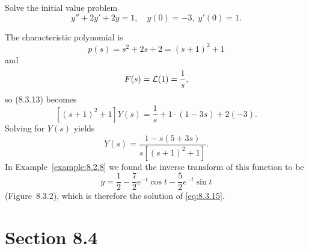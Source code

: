 \setcounter{example}{3}
\setcounter{equation}{14}
\begin{example}
  \label{example:8.3.4}\rm Solve the initial value problem
  \begin{equation}
    \label{eq:8.3.15}y''+2y'+2y=1,\quad y(0)=-3,\;y'(0)=1.
  \end{equation}
\end{example}
\begin{examplesolution}
\solution The characteristic polynomial is
\[
  p(s)=s^{2}+2s+2=(s+1)^{2}+1
\]
and
\[
  F(s)={\cal L}(1)=\frac{1}{s},
\]
so \textup{(8.3.13)} becomes
\[
  \left[(s+1)^{2}+1\right]Y(s)=\frac{1}{s}+1\cdot(1-3s)+2(-3).
\]
Solving for $Y(s)$ yields
\[
  Y(s)=\frac{1-s(5+3s)}{s\left[(s+1)^{2}+1\right]}.
\]
In Example~\ref{example:8.2.8} we found the inverse transform of this function to be
\[
  y=\frac{1}{2}-\frac{7}{2}e^{-t}\cos t-\frac{5}{2}e^{-t}\sin t
\]
(Figure~8.3.2), which is therefore the solution of \eqref{eq:8.3.15}.
\end{examplesolution}

\section*{Section 8.4}
\setcounter{chapter}{8}
\setcounter{section}{4}

